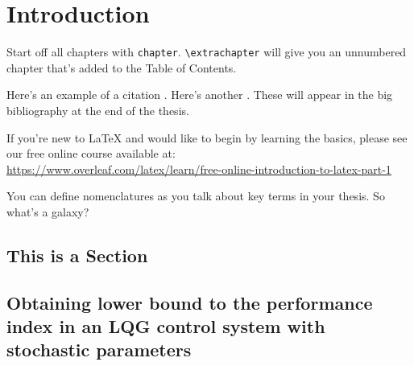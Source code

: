 \documentclass[12pt]{caltech_thesis}
\begin{document}
\tableofcontents
\listoffigures
\listoftables
\printnomenclature

\mainmatter

\chapter{Introduction}
Start off all chapters with \verb|chapter|.  \verb|\extrachapter| will give you an unnumbered chapter that's added to the Table of Contents. 

Here's an example of a citation \citep{GMP81}. Here's another \citep{PP98}. These will appear in the big bibliography at the end of the thesis.

If you're new to \LaTeX{} and would like to begin by learning the basics, please see our free online course available at:\\ \url{https://www.overleaf.com/latex/learn/free-online-introduction-to-latex-part-1} 

You can define nomenclatures  as you talk about key terms in your thesis. So what's a galaxy? 


\section{This is a Section}

\section{Obtaining lower bound to  the performance index in an LQG control system with stochastic parameters}
\end{document}
